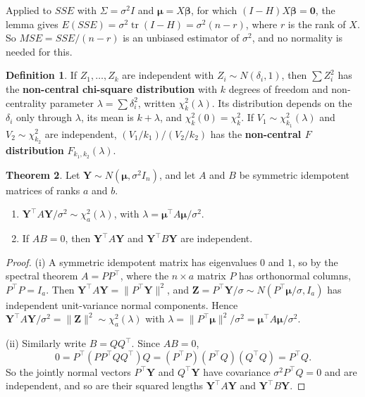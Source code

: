 \documentclass[11pt,a4paper]{article}
\numberwithin{equation}{section}
\theoremstyle{definition}
\newtheorem{thm}{Theorem}[subsection]
\newtheorem{defn}[thm]{Definition}
\begin{document}
Applied to $SSE$ with $\Sigma = \sigma^2I$ and $\boldsymbol\mu = X\boldsymbol\beta$, for which $(I - H)X\boldsymbol\beta = \mathbf 0$, the lemma gives $E(SSE) = \sigma^2\operatorname{tr}(I - H) = \sigma^2(n - r)$, where $r$ is
the rank of $X$. So $MSE = SSE/(n - r)$ is an unbiased estimator of $\sigma^2$, and no normality is needed for this.

\begin{defn}
If $Z_1, \dots, Z_k$ are independent with $Z_i \sim N(\delta_i, 1)$, then $\sum Z_i^2$ has the \textbf{non-central chi-square distribution} with $k$ degrees of freedom and
non-centrality parameter $\lambda = \sum\delta_i^2$, written $\chi^2_k(\lambda)$. Its distribution depends on the $\delta_i$ only through $\lambda$, its mean is $k + \lambda$, and
$\chi^2_k(0) = \chi^2_k$. If $V_1 \sim \chi^2_{k_1}(\lambda)$ and $V_2 \sim \chi^2_{k_2}$ are independent, $(V_1/k_1)/(V_2/k_2)$ has the \textbf{non-central $F$ distribution} $F_{k_1,k_2}(\lambda)$.
\end{defn}

\begin{thm}\label{thm:quad-forms}
Let $\mathbf Y \sim N(\boldsymbol\mu, \sigma^2I_n)$, and let $A$ and $B$ be symmetric idempotent matrices of ranks $a$ and $b$.
\begin{enumerate}[label=(\roman*)]
\item $\mathbf Y^\top A\mathbf Y/\sigma^2 \sim \chi^2_a(\lambda)$, with $\lambda = \boldsymbol\mu^\top A\boldsymbol\mu/\sigma^2$.
\item If $AB = 0$, then $\mathbf Y^\top A\mathbf Y$ and $\mathbf Y^\top B\mathbf Y$ are independent.
\end{enumerate}
\end{thm}

\begin{proof}
(i) A symmetric idempotent matrix has eigenvalues $0$ and $1$, so by the spectral theorem $A = PP^\top$, where the $n \times a$ matrix $P$ has orthonormal
columns, $P^\top P = I_a$. Then $\mathbf Y^\top A\mathbf Y = \|P^\top\mathbf Y\|^2$, and $\mathbf Z = P^\top\mathbf Y/\sigma \sim N(P^\top\boldsymbol\mu/\sigma, I_a)$ has independent unit-variance normal
components. Hence $\mathbf Y^\top A\mathbf Y/\sigma^2 = \|\mathbf Z\|^2 \sim \chi^2_a(\lambda)$ with $\lambda = \|P^\top\boldsymbol\mu\|^2/\sigma^2 = \boldsymbol\mu^\top A\boldsymbol\mu/\sigma^2$.

(ii) Similarly write $B = QQ^\top$. Since $AB = 0$,
\[
0 = P^\top(PP^\top QQ^\top)Q = (P^\top P)(P^\top Q)(Q^\top Q) = P^\top Q .
\]
So the jointly normal vectors $P^\top\mathbf Y$ and
$Q^\top\mathbf Y$ have covariance $\sigma^2P^\top Q = 0$ and are independent, and so are their squared lengths $\mathbf Y^\top A\mathbf Y$ and $\mathbf Y^\top B\mathbf Y$.
\end{proof}
\end{document}
